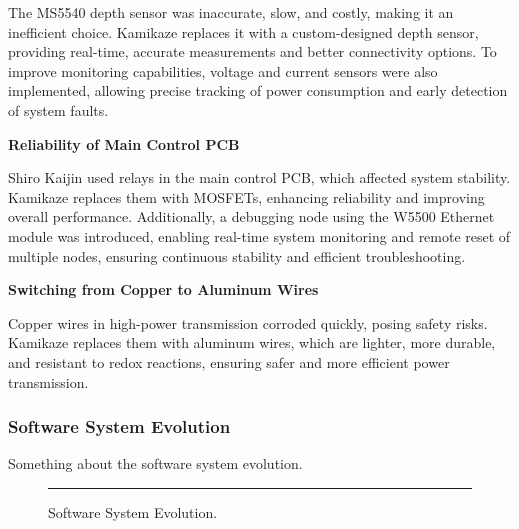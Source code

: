 The MS5540 depth sensor was inaccurate, slow, and costly, making it an inefficient choice. Kamikaze replaces it with a custom-designed depth sensor, providing real-time, accurate measurements and better connectivity options. To improve monitoring capabilities, voltage and current sensors were also implemented, allowing precise tracking of power consumption and early detection of system faults.

\vspace{0.2cm}
\textbf{Reliability of Main Control PCB}

Shiro Kaijin used relays in the main control PCB, which affected system stability. Kamikaze replaces them with MOSFETs, enhancing reliability and improving overall performance. Additionally, a debugging node using the W5500 Ethernet module was introduced, enabling real-time system monitoring and remote reset of multiple nodes, ensuring continuous stability and efficient troubleshooting.

\vspace{0.2cm}
\textbf{Switching from Copper to Aluminum Wires}

Copper wires in high-power transmission corroded quickly, posing safety risks. Kamikaze replaces them with aluminum wires, which are lighter, more durable, and resistant to redox reactions, ensuring safer and more efficient power transmission.

\subsubsection{Software System Evolution}

Something about the software system evolution. \lipsum[1]

\begin{figure}[h]
    \centering
    \rule{0.8\columnwidth}{4cm}
    \caption{Software System Evolution.}
    \label{fig:software_system}
\end{figure}